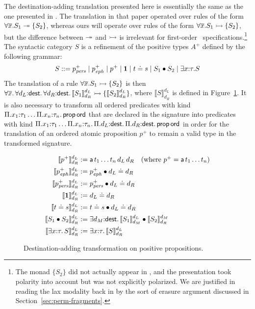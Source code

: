 The destination-adding translation presented here is essentially the
same as the one presented in
\cite{simmons11logical}. The translation in that paper operated over
rules of the form $\forall \overline{x}. S_1 \twoheadrightarrow \{ S_2 \}$,
whereas ours will operate over rules of the form $\forall
\overline{x}. S_1 \rightarrowtail \{ S_2 \}$, but the difference between
$\twoheadrightarrow$ and $\rightarrowtail$ is irrelevant for first-order
\sls~specifications.\footnote{The monad $\{ S_2 \}$ did not actually
  appear in \cite{simmons11logical}, and the presentation took
  polarity into account but was not explicitly polarized. We are
  justified in reading the lax modality back in by the sort of erasure
  argument discussed in Section~\ref{sec:perm-fragments}.} The syntactic
category $S$ is a refinement of the positive types $A^+$ defined by
the following grammar:
\[
S ::= p^+_{\it pers} \mid p^+_{\it eph} \mid p^+ \mid \mathbf{1}
\mid t \doteq s \mid S_1 \mathbin{\bullet} S_2 \mid \exists x{:}\tau. S
\]
The translation of a rule $\forall \overline{x}. S_1 \rightarrowtail \{ S_2 \}$
is then $\forall \overline{x}.\, \forall d_L{:}{\sf dest}.\, \forall
d_R{:}{\sf dest}.\, \llbracket S_1 \rrbracket^{d_L}_{d_R} \rightarrowtail \{
\llbracket S_2 \rrbracket^{d_L}_{d_R} \}$, where $\llbracket S
\rrbracket^{d_L}_{d_R}$ is defined in Figure~\ref{fig:destadd-pos}. It
is also necessary to transform all ordered predicates with kind
$\Pi. x_1{:}\tau_1\ldots \Pi.x_n{:}\tau_n.\,{\sf prop\,ord}$ that are
declared in the signature into predicates with kind
$\Pi. x_1{:}\tau_1\ldots \Pi.x_n{:}\tau_n.\, \Pi.d_L{:}{\sf dest}.\,
\Pi.d_R{:}{\sf dest}.\, {\sf prop\,ord}$ in order for the translation
of an ordered atomic proposition $p^+$ to remain a valid type in
the transformed signature.

\begin{figure}
\begin{align*}
\llbracket p^+ \rrbracket^{d_L}_{d_R} & := 
 {\sf a}\,t_1\ldots t_n\,d_L\,d_R ~~~ \mbox{(where $p^+ = {\sf a}\,t_1\ldots t_n$)}
\\
\llbracket p^+_{\it eph} \rrbracket^{d_L}_{d_R} & := p^+_{\it eph} \mathbin{\bullet} d_L \doteq d_R
\\
\llbracket p^+_{\it pers} \rrbracket^{d_L}_{d_R} & := p^+_{\it pers} \mathbin{\bullet} d_L \doteq d_R
\\
\llbracket \mathbf{1} \rrbracket^{d_L}_{d_R} & := d_L \doteq d_R
\\
\llbracket t \doteq s \rrbracket^{d_L}_{d_R} & := t \doteq s \mathbin{\bullet} d_L \doteq d_R
\\
\llbracket S_1 \mathbin{\bullet} S_2 \rrbracket^{d_L}_{d_R} & := 
 \exists d_M{:}{\sf dest}.\, 
   \llbracket S_1 \rrbracket^{d_L}_{d_M}
   \mathbin{\bullet}
   \llbracket S_2 \rrbracket^{d_M}_{d_R}
\\
\llbracket \exists x{:}\tau.\,S \rrbracket^{d_L}_{d_R} & := 
 \exists x{:}\tau.\, \llbracket S \rrbracket^{d_L}_{d_R}
\end{align*}
\caption{Destination-adding transformation on positive propositions.}
\label{fig:destadd-pos}
\end{figure}

